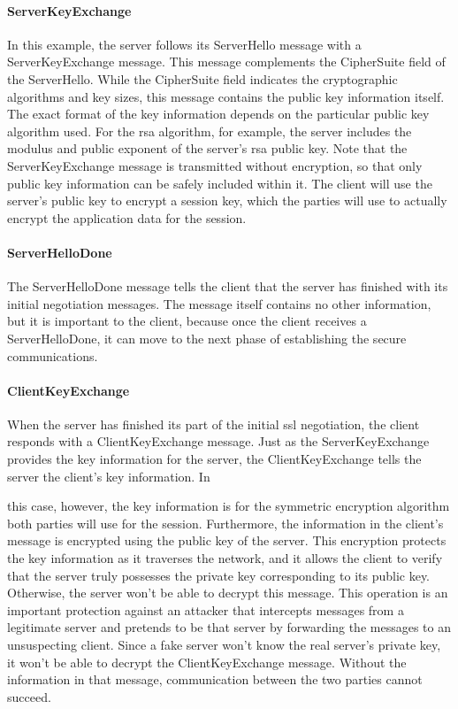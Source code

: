 \paragraph*{ServerKeyExchange}
In this example, the server follows its ServerHello message with a
ServerKeyExchange message. This message complements the CipherSuite field 
of the ServerHello. While the CipherSuite field indicates
the cryptographic algorithms and key sizes, this message contains the
public key information itself. The exact format of the key information depends
 on the particular public key algorithm used. For the rsa
algorithm, for example, the server includes the modulus and public
exponent of the server’s rsa public key.
Note that the ServerKeyExchange message is transmitted without
encryption, so that only public key information can be safely included within it.
 The client will use the server’s public key to encrypt
a session key, which the parties will use to actually encrypt the application
 data for the session.
\paragraph*{ServerHelloDone}
The ServerHelloDone message tells the client that the server has finished with
 its initial negotiation messages. The message itself contains no other 
 information, but it is important to the client, because
once the client receives a ServerHelloDone, it can move to the next
phase of establishing the secure communications.
\paragraph*{ClientKeyExchange}
When the server has finished its part of the initial ssl negotiation,
the client responds with a ClientKeyExchange message. Just as the
ServerKeyExchange provides the key information for the server, the
ClientKeyExchange tells the server the client’s key information. In

this case, however, the key information is for the symmetric encryption 
algorithm both parties will use for the session. Furthermore, the
information in the client’s message is encrypted using the public key
of the server. This encryption protects the key information as it traverses
 the network, and it allows the client to verify that the server
truly possesses the private key corresponding to its public key. Otherwise,
 the server won’t be able to decrypt this message. This operation is an 
 important protection against an attacker that intercepts
messages from a legitimate server and pretends to be that server by
forwarding the messages to an unsuspecting client. Since a fake
server won’t know the real server’s private key, it won’t be able to decrypt 
the ClientKeyExchange message. Without the information in
that message, communication between the two parties cannot succeed.
